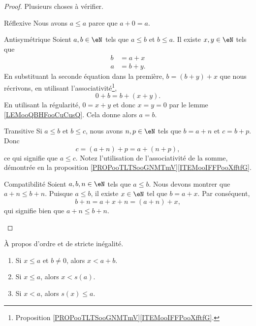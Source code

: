 \begin{proof}
    Plusieurs choses à vérifier.
    \begin{subproof}
    \item[Réflexive]
        Nous avons \( a\leq a\) parce que \( a+0=a\).
    \item[Antisymétrique]
        Soient \( a,b\in \eN\) tels que \( a\leq b\) et \( b\leq a\). Il existe \( x,y\in \eN\) tels que
        \begin{subequations}
            \begin{align}
                b&=a+x\\
                a&=b+y.
            \end{align}
        \end{subequations}
        En substituant la seconde équation dans la première, \( b=(b+y)+x\) que nous récrivons, en utilisant l'associativité\footnote{Proposition \ref{PROPooTLTSooGNMTmV}\ref{ITEMooIFFPooXfftfG}.},
        \begin{equation}
            0+b=b+(x+y).
        \end{equation}
        En utilisant la régularité, \( 0=x+y\) et donc \( x=y=0\) par le lemme \ref{LEMooQBHFooCuCusQ}. Cela donne alors \( a=b\).
    \item[Transitive]
        Si \( a\leq b\) et \( b\leq c\), nous avons \( n,p\in \eN\) tels que \( b=a+n\) et \( c=b+p\). Donc
        \begin{equation}
            c=(a+n)+p=a+(n+p),
        \end{equation}
        ce qui signifie que \( a\leq c\). Notez l'utilisation de l'associativité de la somme, démontrée en la proposition \ref{PROPooTLTSooGNMTmV}\ref{ITEMooIFFPooXfftfG}.
    \item[Compatibilité]
        Soient \( a,b,n\in \eN\) tels que \( a\leq b\). Nous devons montrer que \( a+n\leq b+n\). Puisque \( a\leq b\), il existe \( x\in \eN\) tel que \( b=a+x\). Par conséquent,
        \begin{equation}
            b+n=a+x+n=(a+n)+x,
        \end{equation}
        qui signifie bien que \( a+n\leq b+n\).
    \end{subproof}
\end{proof}

\begin{lemma}       \label{LEMooPVRQooXPMKTt}
    À propos d'ordre et de stricte inégalité.
    \begin{enumerate}
        \item       \label{ITEMooGWWFooYGPCZw}
            Si \( x\leq a\) et \( b\neq 0\), alors \( x<a+b\).
        \item       \label{ITEMooRWGWooAfkrri}
            Si \( x\leq a\), alors \( x<s(a)\).
        \item       \label{ITEMooWCOIooMWrCag}
            Si \( x<a\), alors \( s(x)\leq a\).
    \end{enumerate}
\end{lemma}

